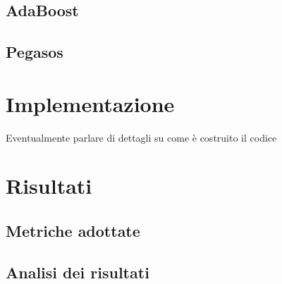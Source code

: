 \documentclass[11pt,a4paper]{report}
\begin{document}
\section{AdaBoost}
\section{Pegasos}

\chapter{Implementazione}
Eventualmente parlare di dettagli su come è costruito il codice
\chapter{Risultati}
\section{Metriche adottate}
\section{Analisi dei risultati}
\end{document}
